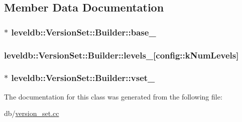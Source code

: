 \subsection{Member Data Documentation}
\hypertarget{classleveldb_1_1_version_set_1_1_builder_a473a78b62dff568cb0304aa914c8a1d8}{
\subsubsection[{base\-\_\-}]{$\ast$ leveldb\-::\-Version\-Set\-::\-Builder\-::base\-\_\-\hspace{0.3cm}{\ttfamily [private]}}}\label{classleveldb_1_1_version_set_1_1_builder_a473a78b62dff568cb0304aa914c8a1d8}
\hypertarget{classleveldb_1_1_version_set_1_1_builder_ad11ed07449801fd19dd721b7b710d067}{
\subsubsection[{levels\-\_\-}]{ leveldb\-::\-Version\-Set\-::\-Builder\-::levels\-\_\-\mbox{[}{\bf config\-::k\-Num\-Levels}\mbox{]}\hspace{0.3cm}{\ttfamily [private]}}}\label{classleveldb_1_1_version_set_1_1_builder_ad11ed07449801fd19dd721b7b710d067}
\hypertarget{classleveldb_1_1_version_set_1_1_builder_a96967ae813b41ac070e8a9ea3df0dd7c}{
\subsubsection[{vset\-\_\-}]{$\ast$ leveldb\-::\-Version\-Set\-::\-Builder\-::vset\-\_\-\hspace{0.3cm}{\ttfamily [private]}}}\label{classleveldb_1_1_version_set_1_1_builder_a96967ae813b41ac070e8a9ea3df0dd7c}


The documentation for this class was generated from the following file\-:\begin{DoxyCompactItemize}
\item 
db/\hyperlink{version__set_8cc}{version\-\_\-set.\-cc}\end{DoxyCompactItemize}
